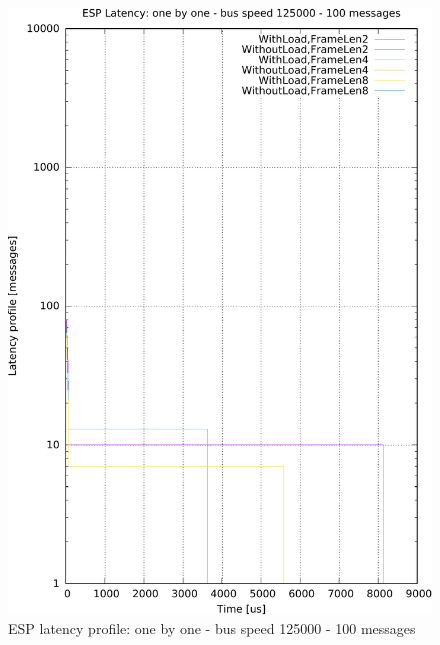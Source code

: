 \documentclass{ctuthesis}
\begin{document}
\begin{figure}[htb]
\includegraphics[width=\linewidth]{figures/speed125000_messages100_floodFalse.pdf}
\caption{ESP latency profile: one by one - bus speed 125000 - 100 messages}
\end{figure}
\end{document}
